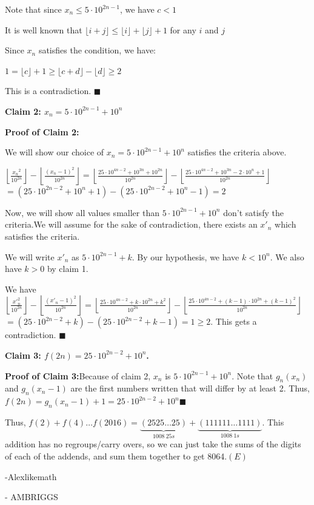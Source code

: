 \begin{enumerate}
 Note that since $x_n \leq 5 \cdot 10^{2n-1}$, we have $c < 1$

 It is well known that $\lfloor i+j \rfloor \leq \lfloor i \rfloor + \lfloor j \rfloor + 1$ for any $i$ and $j$ 

 Since $x_n$ satisfies the condition, we have:

 $1 = \lfloor c \rfloor + 1 \geq  \lfloor{c+d} \rfloor - \lfloor d \rfloor \geq 2$

 This is a contradiction. $\blacksquare$

 \textbf{Claim 2: $x_n = 5 \cdot 10^{2n-1} + 10^n$}

 \textbf{Proof of Claim 2:}

 We will show our choice of $x_n = 5 \cdot 10^{2n-1} + 10^n$ satisfies the criteria above.

 $\left \lfloor \frac{{x_n}^2}{10^{2n}} \right \rfloor - \left \lfloor \frac{(x_n-1)^2}{10^{2n}} \right \rfloor = \left \lfloor \frac{25 \cdot 10^{4n - 2} + 10^{3n} + 10^{2n}}{10^{2n}} \right \rfloor - \left \lfloor \frac{25 \cdot 10^{4n - 2} + 10^{3n}   - 2 \cdot 10^n + 1}{10^{2n}} \right \rfloor$
$= (25 \cdot 10^{2n-2} + 10^{n} + 1) - (25 \cdot 10^{2n-2} + 10^{n} - 1) = 2$

 Now, we will show all values smaller than $5 \cdot 10^{2n-1} + 10^n$ don’t satisfy the criteria.We will assume for the sake of contradiction, there exists an $x'_n$ which satisfies the criteria.

 We will write $x'_n$ as $5 \cdot 10^{2n - 1} + k$. By our hypothesis, we have $k < 10^n$. We also have $k > 0$ by claim 1.

 We have $\left \lfloor \frac{{x'}_n^2}{10^{2n}} \right \rfloor -  \left \lfloor \frac{(x'_n-1)^2}{10^{2n}} \right \rfloor = \left \lfloor \frac{25 \cdot 10^{4n - 2} + k \cdot 10^{2n} + k^2}{10^{2n}} \right \rfloor - \left \lfloor \frac{25 \cdot 10^{4n - 2} + (k-1) \cdot 10^{2n} + (k-1)^2   }{10^{2n}} \right \rfloor$
$= (25 \cdot 10^{2n-2} + k) - (25 \cdot 10^{2n-2} + k - 1) = 1 \geq 2.$ This gets a contradiction. $\blacksquare$

 \textbf{Claim 3: $f(2n) = 25 \cdot10^{2n - 2} + 10^{n}$. }

 \textbf{Proof of Claim 3:}Because of claim 2, $x_n$ is $5 \cdot 10^{2n-1} + 10^n$. Note that $g_n(x_n)$ and $g_n(x_n - 1)$ are the first numbers written that will differ by at least 2. Thus, $f(2n) = g_n(x_n - 1) + 1 = 25 \cdot 10^{2n-2} + 10^n$$\blacksquare$

 
Thus, $f(2) + f(4) \dots f(2016) = \underbrace{(2525 \dots 25)}_{1008 \ 25s} + \underbrace{(111111 \dots 1111)}_{1008 \ 1s}$. This addition has no regroups/carry overs, so we can just take the sums of the digits of each of the addends, and sum them together to get 8064.$\boxed{(E)}$

 -Alexlikemath

 - AMBRIGGS

 


\end{enumerate}